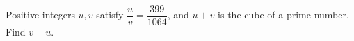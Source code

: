 Positive integers $u,v$ satisfy $\dfrac{u}{v}=\dfrac{399}{1064}$, and $u+v$ is the cube of a prime number. Find $v-u$.

